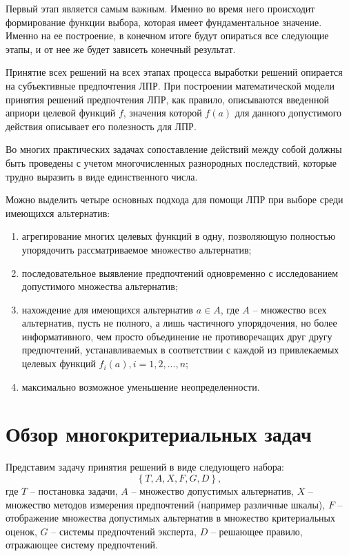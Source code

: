 \par Первый этап является самым важным. Именно во время него происходит формирование функции выбора, которая имеет фундаментальное значение. Именно на ее построение, в конечном итоге будут опираться все следующие этапы, и от нее же будет зависеть конечный результат.

\par Принятие всех решений на всех этапах процесса выработки решений опирается на субъективные предпочтения ЛПР. При построении математической модели принятия решений предпочтения ЛПР, как правило, описываются введенной априори целевой функций $f$, значения которой $f(a)$ для данного допустимого действия описывает его полезность для ЛПР.
\par Во многих практических задачах сопоставление действий между собой должны быть проведены с учетом многочисленных разнородных последствий, которые трудно выразить в виде единственного числа.
\par Можно выделить четыре основных подхода для помощи ЛПР при выборе среди имеющихся альтернатив:
\begin{enumerate}[label=\arabic*)]
    \item агрегирование многих целевых функций в одну, позволяющую полностью упорядочить рассматриваемое множество альтернатив;
    \item последовательное выявление предпочтений одновременно с исследованием допустимого множества альтернатив;
    \item нахождение для имеющихся альтернатив \begin{math}a \in A\end{math}, где $A$ -- множество всех альтернатив, пусть не полного, а лишь частичного упорядочения, но более информативного, чем просто объединение не противоречащих друг другу предпочтений, устанавливаемых в соответствии с каждой из привлекаемых целевых функций \begin{math}f_{i}(a), i=1,2,...,n\end{math};
    \item максимально возможное уменьшение неопределенности.
\end{enumerate}

\section{Обзор многокритериальных задач}
\par Представим задачу принятия решений в виде следующего набора:
\begin{equation} \label{for1}
\left\{ T, A, X, F,G,D \right\}
,\end{equation}
где $T$ -- постановка задачи, $A$ -- множество допустимых альтернатив, $X$ -- множество методов измерения предпочтений (например различные шкалы), $F$ -- отображение множества допустимых альтернатив в множество критериальных оценок, $G$ -- системы предпочтений эксперта, $D$ -- решающее правило, отражающее систему предпочтений.

